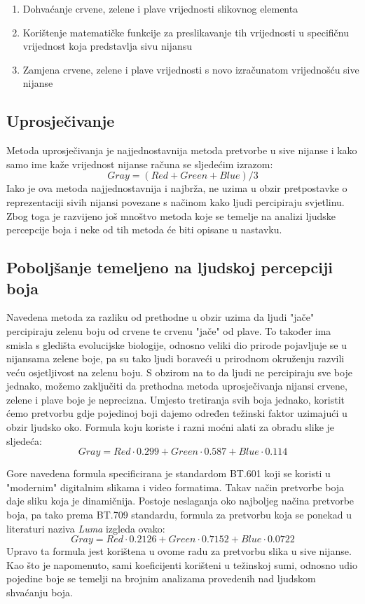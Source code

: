 \documentclass[times, utf8, diplomski]{fer}
\theoremstyle{definition}
\begin{document}
\begin{enumerate}
\item Dohvaćanje crvene, zelene i plave vrijednosti slikovnog elementa
\item Korištenje matematičke funkcije za preslikavanje tih vrijednosti u specifičnu vrijednost koja predstavlja sivu nijansu
\item Zamjena crvene, zelene i plave vrijednosti s novo izračunatom vrijednošću sive nijanse
\end{enumerate}

\subsection{Uprosječivanje}
Metoda uprosječivanja je najjednostavnija metoda pretvorbe u sive nijanse i kako samo ime kaže vrijednost nijanse računa se sljedećim izrazom:
\begin{equation}
Gray = (Red + Green + Blue) / 3
\end{equation}
Iako je ova metoda najjednostavnija i najbrža, ne uzima u obzir pretpostavke o reprezentaciji sivih nijansi povezane s načinom kako ljudi percipiraju svjetlinu. Zbog toga je razvijeno još mnoštvo metoda koje se temelje na analizi ljudske percepcije boja i neke od tih metoda će biti opisane u nastavku.

\subsection{Poboljšanje temeljeno na ljudskoj percepciji boja}
Navedena metoda za razliku od prethodne u obzir uzima da ljudi "jače" percipiraju zelenu boju od crvene te crvenu "jače" od plave. To također ima smisla s gledišta evolucijske biologije, odnosno veliki dio prirode pojavljuje se u nijansama zelene boje, pa su tako ljudi boraveći u prirodnom okruženju razvili veću osjetljivost na zelenu boju. S obzirom na to da ljudi ne percipiraju sve boje jednako, možemo zaključiti da prethodna metoda uprosječivanja nijansi crvene, zelene i plave boje je neprecizna.
Umjesto tretiranja svih boja jednako, koristit ćemo pretvorbu gdje pojedinoj boji dajemo određen težinski faktor uzimajući u obzir ljudsko oko. Formula koju koriste i razni moćni alati za obradu slike je sljedeća:
\begin{equation}
Gray = Red \cdot 0.299 + Green \cdot 0.587 + Blue \cdot 0.114
\end{equation}

Gore navedena formula specificirana je standardom BT.601 koji se koristi u "modernim" digitalnim slikama i video formatima. Takav način pretvorbe boja daje sliku koja je dinamičnija.
Postoje neslaganja oko najboljeg načina pretvorbe boja, pa tako prema BT.709 standardu, formula za pretvorbu koja se ponekad u literaturi naziva \textit{Luma} izgleda ovako:
\begin{equation}
Gray = Red \cdot 0.2126 + Green \cdot 0.7152 + Blue \cdot 0.0722
\end{equation}
Upravo ta formula jest korištena u ovome radu za pretvorbu slika u sive nijanse.
Kao što je napomenuto, sami koeficijenti korišteni u težinskoj sumi, odnosno udio pojedine boje se temelji na brojnim analizama provedenih nad ljudskom shvaćanju boja.
\end{document}
